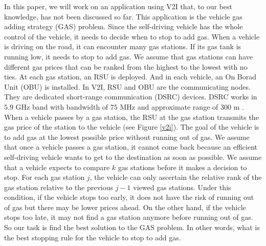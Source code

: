 \documentclass[conference]{IEEEtran}
\theoremstyle{definition}
\begin{document}
In this paper, we will work on an application using V2I that, to our best knowledge, has not been discussed so far. This application is the vehicle gas adding strategy (GAS) problem. Since the self-driving vehicle has the whole control of the vehicle, it needs to decide when to stop to add gas. When a vehicle is driving on the road, it can encounter many gas stations. If its gas tank is running low, it needs to stop to add gas. We assume that gas stations can have different gas prices that can be ranked from the highest to the lowest with no ties. At each gas station, an RSU is deployed. And in each vehicle, an On Borad Unit (OBU) is installed. In V2I, RSU and OBU are the communicating nodes.  They are dedicated short-range communication (DSRC) devices. DSRC works in $5.9$ GHz band with bandwidth of $75$ MHz and approximate range of $300$ m \cite{DSRC}.   When a vehicle passes by a gas station, the RSU at the gas station  transmits the gas price of the station to the vehicle (see Figure \ref{v2i}). The goal of the vehicle is to add gas at the lowest possible price without running out of gas. We assume that once a vehicle passes a gas station, it cannot come back because an efficient self-driving vehicle wants to get to the destination as soon as possible.  We assume that a vehicle expects to compare $k$ gas stations before it makes a decision to stop. For each gas station $j$, the vehicle can only ascertain the relative rank of the gas station relative to the previous $j-1$ viewed gas stations. Under this condition, if the vehicle stops too early, it does not have the risk of running out of gas but there may be lower prices ahead. On the other hand, if the vehicle stops too late, it may not find a gas station anymore before running out of gas. So our task is find the best solution to the GAS problem. In other words, what is the best stopping rule for the vehicle to stop to add gas.
\end{document}
